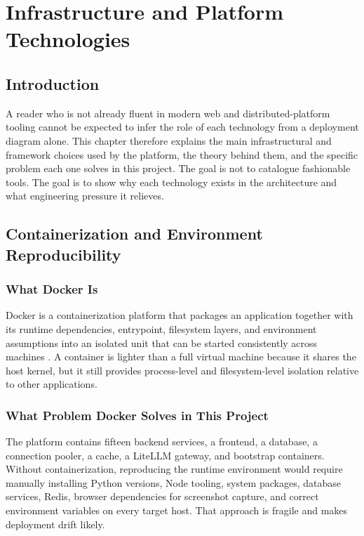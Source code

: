 \chapter{Infrastructure and Platform Technologies}
\thispagestyle{plain}
\section*{Introduction}
A reader who is not already fluent in modern web and distributed-platform tooling cannot be expected to infer the role of each technology from a deployment diagram alone. This chapter therefore explains the main infrastructural and framework choices used by the platform, the theory behind them, and the specific problem each one solves in this project. The goal is not to catalogue fashionable tools. The goal is to show why each technology exists in the architecture and what engineering pressure it relieves.

\section{Containerization and Environment Reproducibility}
\subsection{What Docker Is}
Docker is a containerization platform that packages an application together with its runtime dependencies, entrypoint, filesystem layers, and environment assumptions into an isolated unit that can be started consistently across machines \cite{docker_docs}. A container is lighter than a full virtual machine because it shares the host kernel, but it still provides process-level and filesystem-level isolation relative to other applications.

\subsection{What Problem Docker Solves in This Project}
The platform contains fifteen backend services, a frontend, a database, a connection pooler, a cache, a LiteLLM gateway, and bootstrap containers. Without containerization, reproducing the runtime environment would require manually installing Python versions, Node tooling, system packages, database services, Redis, browser dependencies for screenshot capture, and correct environment variables on every target host. That approach is fragile and makes deployment drift likely.

